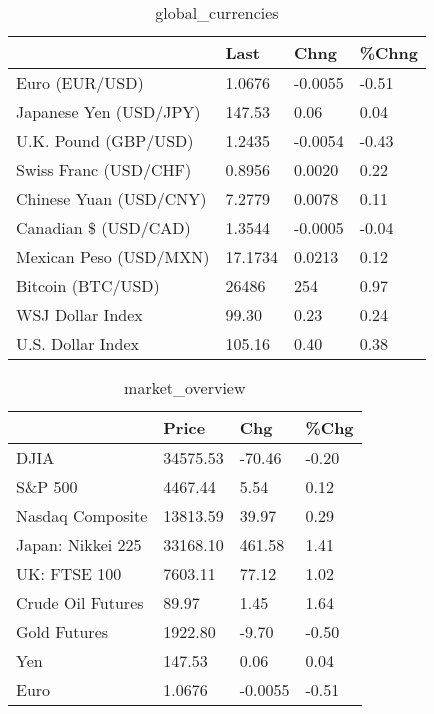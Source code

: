 \documentclass{article}%
\begin{document}
%


\begin{table}[htbp]%
\caption{global\_currencies}%
\centering%
\begin{adjustbox}{width=1\textwidth}%
\begin{tabular}{llll}
\toprule
                       &    Last &    Chng & \%Chng \\
\midrule
        Euro (EUR/USD) &  1.0676 & -0.0055 & -0.51 \\
Japanese Yen (USD/JPY) &  147.53 &    0.06 &  0.04 \\
  U.K. Pound (GBP/USD) &  1.2435 & -0.0054 & -0.43 \\
 Swiss Franc (USD/CHF) &  0.8956 &  0.0020 &  0.22 \\
Chinese Yuan (USD/CNY) &  7.2779 &  0.0078 &  0.11 \\
  Canadian \$ (USD/CAD) &  1.3544 & -0.0005 & -0.04 \\
Mexican Peso (USD/MXN) & 17.1734 &  0.0213 &  0.12 \\
     Bitcoin (BTC/USD) &   26486 &     254 &  0.97 \\
      WSJ Dollar Index &   99.30 &    0.23 &  0.24 \\
     U.S. Dollar Index &  105.16 &    0.40 &  0.38 \\
\bottomrule
\end{tabular}
%
\end{adjustbox}%
\end{table}

%


\begin{table}[htbp]%
\caption{market\_overview}%
\centering%
\begin{adjustbox}{width=1\textwidth}%
\begin{tabular}{llll}
\toprule
                  &    Price &     Chg &  \%Chg \\
\midrule
             DJIA & 34575.53 &  -70.46 & -0.20 \\
          S\&P 500 &  4467.44 &    5.54 &  0.12 \\
 Nasdaq Composite & 13813.59 &   39.97 &  0.29 \\
Japan: Nikkei 225 & 33168.10 &  461.58 &  1.41 \\
     UK: FTSE 100 &  7603.11 &   77.12 &  1.02 \\
Crude Oil Futures &    89.97 &    1.45 &  1.64 \\
     Gold Futures &  1922.80 &   -9.70 & -0.50 \\
              Yen &   147.53 &    0.06 &  0.04 \\
             Euro &   1.0676 & -0.0055 & -0.51 \\
\bottomrule
\end{tabular}
%
\end{adjustbox}%
\end{table}

%
\end{document}
